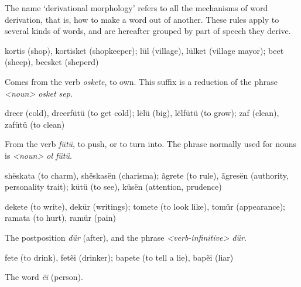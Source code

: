 The name ‘derivational morphology’ refers to all the mechanisms of word derivation, that is, how to
make a word out of another. These rules apply to several kinds of words, and are hereafter grouped
by part of speech they derive.

kortis (shop), kortisket (shopkeeper); lül (village), lülket (village mayor); beet (sheep), beesket (sheperd)

Comes from the verb \emph{oskete}, to own. This suffix is a reduction of the phrase \emph{<noun> osket sep}.

dreer (cold), dreerfütü (to get cold); lëlü (big), lëlfütü (to grow); zaf (clean), zafütü (to clean)

From the verb \emph{fütü}, to push, or to turn into. The phrase normally used for nouns is \emph{<noun> ol fütü}.

shëskata (to charm), shëskasën (charisma); ãgrete (to rule), ãgresën (authority, personality trait); kütü (to see), küsën (attention, prudence)


dekete (to write), dekür (writings); tomete (to look like), tomür (appearance); ramata (to hurt), ramür (pain)

The postposition \emph{dür} (after), and the phrase \emph{<verb-infinitive> dür}.

fete (to drink), fetẽi (drinker); bapete (to tell a lie), bapẽi (liar)

The word \emph{ẽi} (person).

